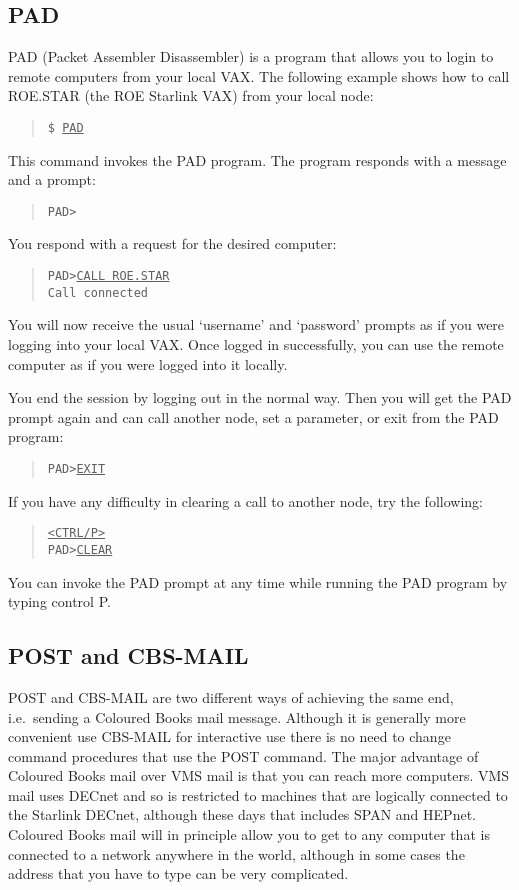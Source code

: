 \subsection{PAD}
PAD (Packet Assembler Disassembler) is a program that allows you to login to
remote computers from your local VAX.
The following example shows how to call ROE.STAR (the ROE Starlink VAX)
from your local node:
\begin{quote}
{\tt \$ \underline{PAD}}
\end{quote}
This command invokes the PAD program.
The program responds with a message and a prompt:
\begin{quote}
{\tt PAD>}
\end{quote}
You respond with a request for the desired computer:
\begin{quote}
{\tt PAD>\underline{CALL ROE.STAR}\\
Call connected}
\end{quote}
You will now receive the usual `username' and `password' prompts as if you were
logging into your local VAX.
Once logged in successfully, you can use the remote computer as if you were
logged into it locally.

You end the session by logging out in the normal way.
Then you will get the PAD prompt again and can call another node, set a
parameter, or exit from the PAD program:
\begin{quote}
{\tt PAD>\underline{EXIT}}
\end{quote}
If you have any difficulty in clearing a call to another node, try the
following:
\begin{quote}
{\tt \underline{<CTRL/P>}\\
PAD>\underline{CLEAR}}
\end{quote}
You can invoke the PAD prompt at any time while running the PAD program
by typing control P.
\subsection{POST and CBS-MAIL}
POST and CBS-MAIL are two different ways of achieving the same end, i.e.\
sending a Coloured Books mail message.
Although it is generally more convenient use CBS-MAIL for interactive use
there is no need to change command procedures that use the POST command.
The major advantage of Coloured Books mail over VMS mail is that you can reach
more computers. VMS mail uses DECnet and so is restricted to machines that are
logically connected to the Starlink DECnet, although these days that includes
SPAN and HEPnet. Coloured Books mail will in principle allow you to get to any
computer that is connected to a network anywhere in the world, although in some
cases the address that you have to type can be very complicated.

